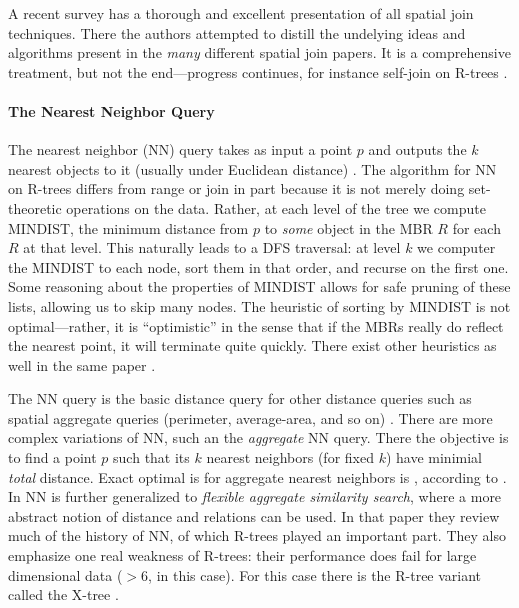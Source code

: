 A recent survey \cite{jacoxsamet07} has a thorough and excellent presentation of all spatial join techniques.
There the authors attempted to distill the undelying ideas and algorithms present in the \emph{many} different spatial join papers.
It is a comprehensive treatment, but not the end---progress continues, for instance self-join on R-trees \cite{vassilakopouloscorralkaranikolas11}.

\paragraph{The Nearest Neighbor Query}
The nearest neighbor (NN) query takes as input a point $p$ and outputs the $k$ nearest objects to it (usually under Euclidean distance) \cite{roussopouloskelleyvincent95}.
The algorithm for NN on R-trees differs from range or join in part because it is not merely doing set-theoretic operations on the data. 
Rather, at each level of the tree we compute MINDIST, the minimum distance from $p$ to \emph{some} object in the MBR $R$ for each $R$ at that level.
This naturally leads to a DFS traversal: at level $k$ we computer the MINDIST to each node, sort them in that order, and recurse on the first one.
Some reasoning about the properties of MINDIST allows for safe pruning of these lists, allowing us to skip many nodes.
The heuristic of sorting by MINDIST is not optimal---rather, it is ``optimistic'' in the sense that if the MBRs really do reflect the nearest point, it will terminate quite quickly.
There exist other heuristics as well in the same paper \cite{roussopouloskelleyvincent95}.

The NN query is the basic distance query for other distance queries such as spatial aggregate queries (perimeter, average-area, and so on) \cite{corralalmendros-jimenez07}.
There are more complex variations of NN, such an the \emph{aggregate} NN query.
There the objective is to find a point $p$ such that its $k$ nearest neighbors (for fixed $k$) have minimial \emph{total} distance.
Exact optimal is for aggregate nearest neighbors is \cite{papadiastaomouratidishui05}, according to \cite{liliyiyaowang11}.
In \cite{liliyiyaowang11} NN is further generalized to \emph{flexible aggregate similarity search}, where a more abstract notion of distance and relations can be used.
In that paper they review much of the history of NN, of which R-trees played an important part.
They also emphasize one real weakness of R-trees: their performance does fail for large dimensional data ($>6$, in this case).
For this case there is the R-tree variant called the X-tree \cite{berchtold2001x}.

